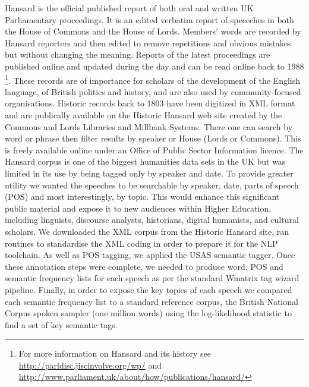 Hansard is the official published report of both oral and written UK Parliamentary proceedings. It is an edited verbatim report of speeeches in both the House of Commons and the House of Lords. Members' words are recorded by Hansard reporters and then edited to remove repetitions and obvious mistakes but without changing the meaning. Reports of the latest proceedings are published online and updated during the day and can be read online back to 1988%
\footnote{For more information on Hansard and its history see \url{http://parldisc.jiscinvolve.org/wp/} and \url{http://www.parliament.uk/about/how/publications/hansard/}}. 
These records are of importance for scholars of the development of the English language, of British politics and history, and are also used by community-focused organisations.  Historic records back to 1803 have been digitized in XML format and are publically available on the Historic Hansard web site created by the Commons and Lords Libraries and Millbank Systems. There one can search by word or phrase then filter results by speaker or House (Lords or Commons). This is freely available online under an Office of Public Sector Information licence. 
The Hansard corpus is one of the biggest humanities data sets in the UK but was limited in its use by being tagged only by speaker and date. To provide greater utility we wanted the speeches to be searchable by speaker, date, parts of speech (POS) and most interestingly, by topic. This would enhance this significant public material and expose it to new audiences within Higher Education, including linguists, discourse analysts, historians, digital humanists, and cultural scholars. 
We downloaded the XML corpus from the Historic Hansard site, ran routines to standardise the XML coding in order to prepare it for the NLP toolchain. As well as POS tagging, we applied the USAS semantic tagger. Once these annotation steps were complete, we needed to produce word, POS and semantic frequency lists for each speech as per the standard Wmatrix tag wizard pipeline. Finally, in order to expose the key topics of each speech we compared each semantic frequency list to a standard reference corpus, the British National Corpus spoken sampler (one million words) using the log-likelihood statistic to find a set of key semantic tags.





